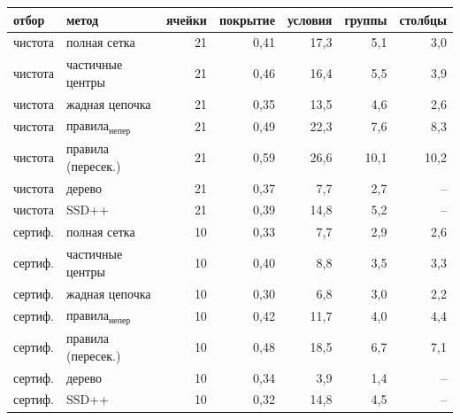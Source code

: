 \begin{tabular}{llrrrrr}
\toprule
отбор & метод & ячейки & покрытие & условия & группы & столбцы\\
\midrule
чистота & полная сетка & 21 & 0{,}41 & 17{,}3 & 5{,}1 & 3{,}0\\
чистота & частичные центры & 21 & 0{,}46 & 16{,}4 & 5{,}5 & 3{,}9\\
чистота & жадная цепочка & 21 & 0{,}35 & 13{,}5 & 4{,}6 & 2{,}6\\
чистота & правила$_{\mathrm{непер}}$ & 21 & 0{,}49 & 22{,}3 & 7{,}6 & 8{,}3\\
чистота & правила (пересек.) & 21 & 0{,}59 & 26{,}6 & 10{,}1 & 10{,}2\\
чистота & дерево & 21 & 0{,}37 & 7{,}7 & 2{,}7 & --\\
чистота & SSD++ & 21 & 0{,}39 & 14{,}8 & 5{,}2 & --\\
\midrule
сертиф. & полная сетка & 10 & 0{,}33 & 7{,}7 & 2{,}9 & 2{,}6\\
сертиф. & частичные центры & 10 & 0{,}40 & 8{,}8 & 3{,}5 & 3{,}3\\
сертиф. & жадная цепочка & 10 & 0{,}30 & 6{,}8 & 3{,}0 & 2{,}2\\
сертиф. & правила$_{\mathrm{непер}}$ & 10 & 0{,}42 & 11{,}7 & 4{,}0 & 4{,}4\\
сертиф. & правила (пересек.) & 10 & 0{,}48 & 18{,}5 & 6{,}7 & 7{,}1\\
сертиф. & дерево & 10 & 0{,}34 & 3{,}9 & 1{,}4 & --\\
сертиф. & SSD++ & 10 & 0{,}32 & 14{,}8 & 4{,}5 & --\\
\bottomrule
\end{tabular}
